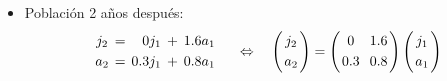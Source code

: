 \begin{frame}
\begin{itemize}
		\vspace{4mm}
		\item Población {\color{red}2} años después: 
		\[	
		\begin{array}{c@{\hspace{0.7\tabcolsep}}c@{\hspace{0.7\tabcolsep}}r@{\hspace{0.7\tabcolsep}}c@{\hspace{0.7\tabcolsep}}c}
		j_2 & = & 0j_1 & + & 1.6a_1 \\[1mm]
		a_2 & = & 0.3j_1 & + & 0.8a_1 \\
		\end{array}
		\quad \Leftrightarrow \quad 
		\left(
		\begin{array}{@{\hspace{0.2\tabcolsep}}c@{\hspace{0.2\tabcolsep}}}
		j_2 \\[1mm]
		a_2	
		\end{array}
		\right)
		=
		\left(
		\begin{array}{@{\hspace{0.2\tabcolsep}}c@{\hspace{1.2\tabcolsep}}c@{\hspace{0.2\tabcolsep}}}
		0 & 1.6 \\[1mm]
		0.3 & 0.8
		\end{array}
		\right)
		\left(
		\begin{array}{@{\hspace{0.2\tabcolsep}}c@{\hspace{0.2\tabcolsep}}}
			j_1 \\[1mm]
			a_1
		\end{array}
		\right)
		\]
		

\end{itemize}
\end{frame}
